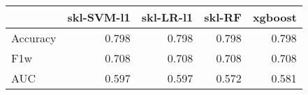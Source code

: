 \begin{tabular}{lrrrr}
\toprule
{} &  skl-SVM-l1 &  skl-LR-l1 &  skl-RF &  xgboost \\
\midrule
Accuracy &       0.798 &      0.798 &   0.798 &    0.798 \\
F1w      &       0.708 &      0.708 &   0.708 &    0.708 \\
AUC      &       0.597 &      0.597 &   0.572 &    0.581 \\
\bottomrule
\end{tabular}
